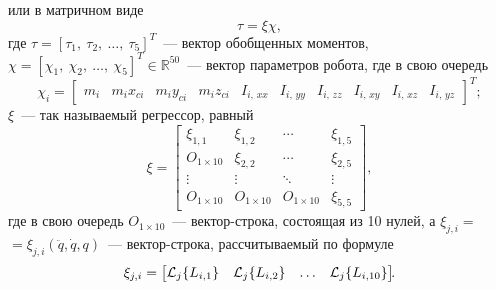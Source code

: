 или в матричном виде
\begin{equation}\label{eq_dynamic_in_linear}
\tau = \xi \chi,
\end{equation}
где $\tau = [\tau_1, \: \tau_2, \: \ldots, \: \tau_5]^T$~--- вектор обобщенных моментов,\\ $\chi=[\chi_1, \: \chi_2, \: \ldots, \: \chi_5]^T \in \mathbb R^{50}$~--- вектор параметров робота, где в свою очередь
\begin{equation}
\chi_i =
\begin{bmatrix}
m_i & m_i x_{ci} & m_i y_{ci} & m_i z_{ci} & I_{i,\,xx} & I_{i,\,yy} & I_{i,\,zz} & I_{i,\,xy} & I_{i,\,xz} & I_{i,\,yz}
\end{bmatrix}^T\!\!\!\!;
\end{equation}
$\xi$~--- так называемый регрессор, равный
\begin{equation}
\xi =
\begin{bmatrix}
\xi_{1,1} & \xi_{1,2} & \cdots & \xi_{1,5} \\
O_{1 \times 10} & \xi_{2,2} & \cdots & \xi_{2,5} \\
\vdots & \vdots & \ddots & \vdots \\
O_{1 \times 10} & O_{1 \times 10} & O_{1 \times 10} & \xi_{5,5}
\end{bmatrix}\!\!,
\end{equation}
где в свою очередь $O_{1 \times 10}$~--- вектор-строка, состоящая из 10 нулей, а $\xi_{j,i} =$\linebreak $= \xi_{j,i}(\ddot{q}, \dot{q}, q)$~--- вектор-строка, рассчитываемый по формуле
\begin{equation}
\xi_{j,i} =
\begin{bmatrix}
\mathcal{L}_j \{L_{i,1}\} & \mathcal{L}_j \{L_{i,2}\} & \ldots & \mathcal{L}_j \{L_{i,10}\}
\end{bmatrix}\!\!\ldotp
\end{equation}


